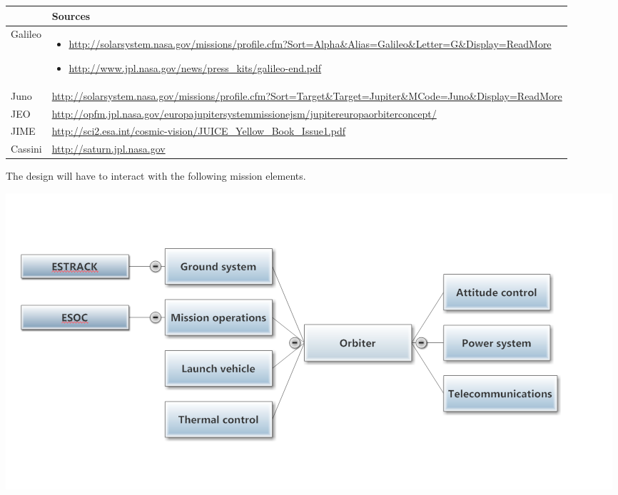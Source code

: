 \begin{supertabular}{p{.1\textwidth}p{.9\textwidth}}
  & Sources \\
  \hline
  Galileo &
  \begin{itemize}
  \item \url{http://solarsystem.nasa.gov/missions/profile.cfm?Sort=Alpha&Alias=Galileo&Letter=G&Display=ReadMore}
  \item \url{http://www.jpl.nasa.gov/news/press_kits/galileo-end.pdf}
  \end{itemize} \\

  Juno &
  \url{http://solarsystem.nasa.gov/missions/profile.cfm?Sort=Target&Target=Jupiter&MCode=Juno&Display=ReadMore}
  \\

  JEO &
  \url{http://opfm.jpl.nasa.gov/europajupitersystemmissionejsm/jupitereuropaorbiterconcept/}
  \\

  JIME &
  \url{http://sci2.esa.int/cosmic-vision/JUICE_Yellow_Book_Issue1.pdf}
  \\

  Cassini &
  \url{http://saturn.jpl.nasa.gov} \\
\end{supertabular}




The design will have to interact with the following mission elements.

\includegraphics[width=\textwidth]{block-diagram-WP1-1B}

